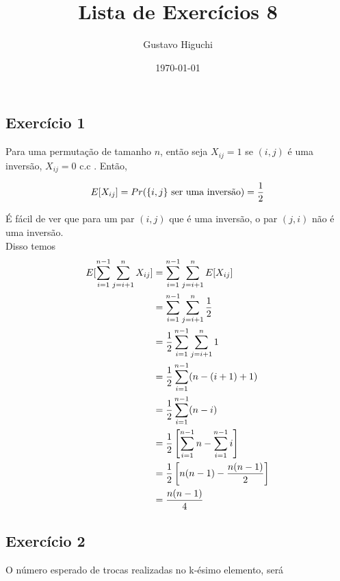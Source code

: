 \documentclass{article}
\title{Lista de Exercícios 8}
\author{Gustavo Higuchi}
\date{\today}
\begin{document}
\maketitle

\tableofcontents
\newpage


\chapter{}
\section{Exercício 1}
\hspace*{15pt}Para uma permutação de tamanho $n$, então seja $X_{ij} = 1$ 
se $(i,j)$ é uma inversão, $X_{ij} = 0$ c.c . Então, 

\begin{equation}
\notag
	E[X_{ij}] = Pr(\{i,j\}\text{ ser uma inversão}) = \dfrac{1}{2}
\end{equation}

É fácil de ver que para um par $(i,j)$ que é uma inversão, o par $(j,i)$ não é uma 
inversão.\\

Disso temos\\

\begin{equation}
\notag
\begin{split}
	E[\sum\limits_{i=1}^{n-1}\sum\limits_{j=i+1}^{n}X_{ij}] &= \sum\limits_{i=1}^{n-1}\sum\limits_{j=i+1}^{n}E[X_{ij}] \\
	&= \sum\limits_{i=1}^{n-1}\sum\limits_{j=i+1}^{n} \dfrac{1}{2}\\
	&= \dfrac{1}{2}\sum\limits_{i=1}^{n-1}\sum\limits_{j=i+1}^{n} 1\\
	&= \dfrac{1}{2}\sum\limits_{i=1}^{n-1} (n - (i+1) + 1)\\
	&= \dfrac{1}{2}\sum\limits_{i=1}^{n-1} (n-i)\\
	&= \dfrac{1}{2}\left[\sum\limits_{i=1}^{n-1} n - \sum\limits_{i=1}^{n-1} i \right]\\
	&= \dfrac{1}{2}\left[n(n-1) - \dfrac{n(n-1)}{2} \right]\\
	&= \dfrac{n(n-1)}{4}
\end{split}
\end{equation}

\section{Exercício 2}
\hspace*{15pt}O número esperado de trocas realizadas no k-ésimo elemento, será
\end{document}
